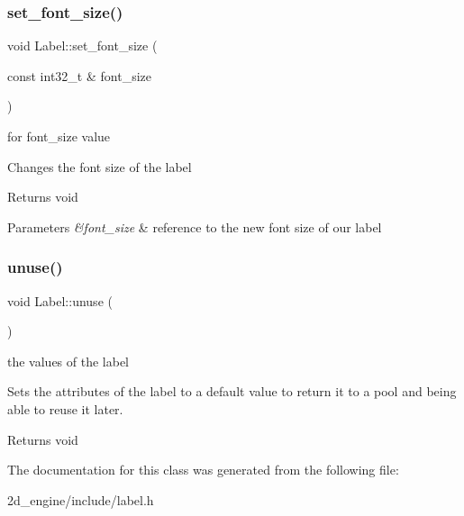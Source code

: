 \subsubsection{\texorpdfstring{set\+\_\+font\+\_\+size()}{set\_font\_size()}}
{\footnotesize\ttfamily void Label\+::set\+\_\+font\+\_\+size (\begin{DoxyParamCaption}\item[{const int32\+\_\+t \&}]{font\+\_\+size }\end{DoxyParamCaption})}

for font\+\_\+size value

Changes the font size of the label

\begin{DoxyReturn}{Returns}
void 
\end{DoxyReturn}

\begin{DoxyParams}{Parameters}
{\em \&font\+\_\+size} & reference to the new font size of our label \\
\hline
\end{DoxyParams}
\mbox{\label{class_label_abafe12b2237df6f7e915d407d8084ec7}} 
\subsubsection{\texorpdfstring{unuse()}{unuse()}}
{\footnotesize\ttfamily void Label\+::unuse (\begin{DoxyParamCaption}{ }\end{DoxyParamCaption})}

the values of the label

Sets the attributes of the label to a default value to return it to a pool and being able to reuse it later.

\begin{DoxyReturn}{Returns}
void 
\end{DoxyReturn}


The documentation for this class was generated from the following file\+:\begin{DoxyCompactItemize}
\item 
2d\+\_\+engine/include/label.\+h\end{DoxyCompactItemize}
